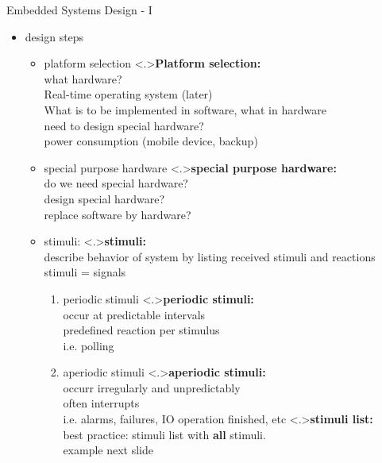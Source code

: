 \documentclass[ngerman={babel}, utf8, bigger, xcolor={table,dvipsnames}, ompress, hyperref={bookmarks,colorlinks}]{beamer}
\begin{document}
\begin{frame}{Embedded Systems Design - I}
	\begin{itemize}
		\item design steps
		\begin{itemize}
			\item platform selection
			\note<.>{\textbf{Platform selection:}\\ what hardware? \\ Real-time operating system {\tiny (later)}\\ What is to be implemented in software, what in hardware \\ need to design special hardware? \\ power consumption (mobile device, backup)}
			\item special purpose hardware
			\note<.>{\textbf{special purpose hardware:}\\ do we need special hardware? \\ design special hardware? \\ replace software by hardware?}
			\item stimuli:
			\note<.>{\textbf{stimuli:}\\ describe behavior of system by listing received stimuli and reactions \\ stimuli = signals \\}
				\begin{enumerate}
					\item periodic stimuli
					\note<.>{\textbf{periodic stimuli:}\\occur at predictable intervals \\ predefined reaction per stimulus \\ i.e. polling}
					\item aperiodic stimuli
					\note<.>{\textbf{aperiodic stimuli:}\\ occurr irregularly and unpredictably \\ often interrupts \\ i.e. alarms, failures, IO operation finished, etc}
					\note<.>{\textbf{stimuli list:}\\best practice: stimuli list with \textbf{all} stimuli. \\ \vspace*{2em} example next slide}
				\end{enumerate}
		\end{itemize}
	\end{itemize}
\end{frame}
\end{document}
